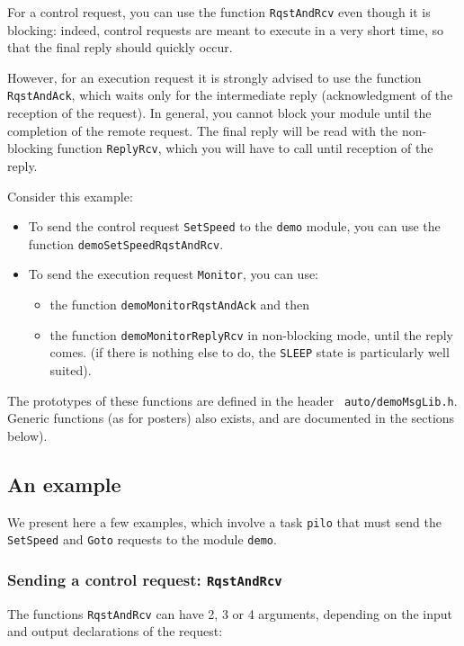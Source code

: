 For a  control request, you  can use  the function  {\tt RqstAndRcv} even
though it is blocking: indeed, control requests are meant to execute in a
very short time, so that the final reply should quickly occur.

However, for  an  execution request it   is strongly advised   to use the
function {\tt  RqstAndAck}, which waits only  for the  intermediate reply
(acknowledgment of the reception of the request).  In general, you cannot
block your module until the completion of the  remote request.  The final
reply will be  read with the  non-blocking function {\tt ReplyRcv}, which
you will have to call until reception of the reply.

Consider this example:

\begin{itemize}
\item To send the control request {\tt SetSpeed} to  the {\tt demo}
module, you can use the function {\tt demoSetSpeedRqstAndRcv}.

\item To send the execution request {\tt Monitor}, you can use:
   \begin{itemize}
      \item the function {\tt demoMonitorRqstAndAck} and then
      \item the function {\tt demoMonitorReplyRcv} in non-blocking mode,
until the reply comes. (if there is nothing else to do, the {\tt SLEEP}
state is particularly well suited).
   \end{itemize}
\end{itemize}

The prototypes  of  these  functions  are defined   in the  header   {\tt
auto/demoMsgLib.h}. Generic functions  (as for posters) also exists,
and are documented in the sections below).

\subsection{An example}

We  present here a few  examples, which involve  a task {\tt pilo} that
must send  the {\tt  SetSpeed} and   {\tt Goto}  requests  to the
module {\tt demo}. 

\subsubsection{Sending a control request: {\tt RqstAndRcv}}

The functions {\tt RqstAndRcv} can have 2, 3 or 4 arguments, depending on
the input and output declarations of the request:

